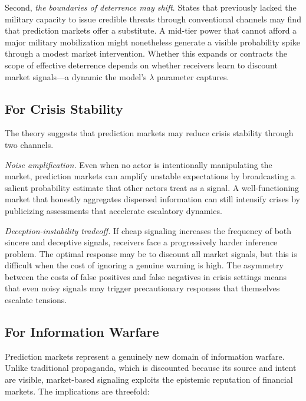 \documentclass[12pt]{article}
\begin{document}
Second, \textit{the boundaries of deterrence may shift}. States that previously lacked the military capacity to issue credible threats through conventional channels may find that prediction markets offer a substitute. A mid-tier power that cannot afford a major military mobilization might nonetheless generate a visible probability spike through a modest market intervention. Whether this expands or contracts the scope of effective deterrence depends on whether receivers learn to discount market signals---a dynamic the model's $\lambda$ parameter captures.

\subsection{For Crisis Stability}

The theory suggests that prediction markets may reduce crisis stability through two channels.

\textit{Noise amplification.} Even when no actor is intentionally manipulating the market, prediction markets can amplify unstable expectations by broadcasting a salient probability estimate that other actors treat as a signal. A well-functioning market that honestly aggregates dispersed information can still intensify crises by publicizing assessments that accelerate escalatory dynamics.

\textit{Deception-instability tradeoff.} If cheap signaling increases the frequency of both sincere and deceptive signals, receivers face a progressively harder inference problem. The optimal response may be to discount all market signals, but this is difficult when the cost of ignoring a genuine warning is high. The asymmetry between the costs of false positives and false negatives in crisis settings means that even noisy signals may trigger precautionary responses that themselves escalate tensions.

\subsection{For Information Warfare}

Prediction markets represent a genuinely new domain of information warfare. Unlike traditional propaganda, which is discounted because its source and intent are visible, market-based signaling exploits the epistemic reputation of financial markets. The implications are threefold:
\end{document}
